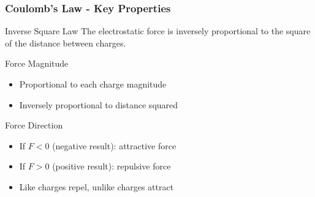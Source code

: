 \documentclass{beamer}
\begin{document}
\begin{frame}
    \frametitle{Coulomb's Law - Key Properties}
    \begin{block}{Inverse Square Law}
        The electrostatic force is inversely proportional to the square of the distance between charges.
    \end{block}
    
    \begin{block}{Force Magnitude}
        \begin{itemize}
            \item Proportional to each charge magnitude
            \item Inversely proportional to distance squared
        \end{itemize}
    \end{block}
    
    \begin{block}{Force Direction}
        \begin{itemize}
            \item If $F < 0$ (negative result): attractive force
            \item If $F > 0$ (positive result): repulsive force
            \item Like charges repel, unlike charges attract
        \end{itemize}
    \end{block}
\end{frame}
\end{document}
